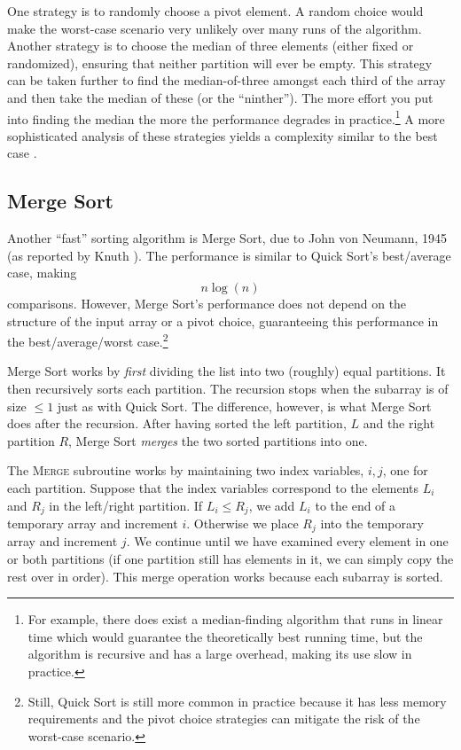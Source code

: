 One strategy is to randomly choose a pivot element.  A random choice 
would make the worst-case scenario very unlikely over many runs of the
algorithm.  Another strategy is to choose the median of three elements 
(either fixed or randomized), ensuring that neither partition will ever
be empty.  This strategy can be taken further to find the 
median-of-three amongst each third of the array and then take the median
of these (or the ``ninther'').  The more effort you put into finding the
median the more the performance degrades in practice.\footnote{For
example, there does exist a median-finding algorithm that runs in
linear time which would guarantee the theoretically best running time, but
the algorithm is recursive and has a large overhead, making its use
slow in practice.}  A more sophisticated analysis of these strategies
yields a complexity similar to the best case \cite{Bentley:1993:ESF:172704.172710}.

\subsection{Merge Sort}

Another ``fast'' sorting algorithm is Merge Sort, due to John von 
Neumann, 1945 (as reported by Knuth \cite{Knuth:1970:VNF:356580.356581}).
The performance is similar to Quick Sort's best/average case, making
  $$n \log{(n)}$$
comparisons.  However, Merge Sort's performance does not depend on the
structure of the input array or a pivot choice, guaranteeing this performance
in the best/average/worst case.\footnote{Still, Quick Sort is still more common
in practice because it has less memory requirements and the pivot choice
strategies can mitigate the risk of the worst-case scenario.}

Merge Sort works by \emph{first} dividing the list into two (roughly) 
equal partitions.  It then recursively sorts each partition.  The
recursion stops when the subarray is of size $\leq 1$ just as with Quick
Sort.  The difference, however, is what Merge Sort does after the
recursion.  After having sorted the left partition, $L$ and the right
partition $R$, Merge Sort \emph{merges} the two sorted partitions into
one.

The \textsc{Merge} subroutine works by maintaining two index variables, 
$i, j$, one for each partition.  Suppose that the index variables 
correspond to the elements $L_i$ and $R_j$ in the left/right partition.
If $L_i \leq R_j$, we add $L_i$ to the end of a temporary array and
increment $i$.  Otherwise we place $R_j$ into the temporary array
and increment $j$.  We continue until we have examined every element
in one or both partitions (if one partition still has elements in it, 
we can simply copy the rest over in order).  This merge operation works
because each subarray is sorted.

